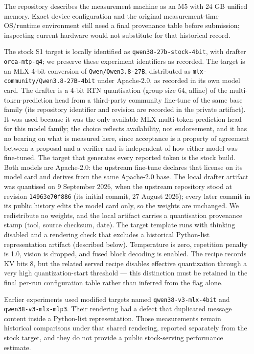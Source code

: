 \documentclass[
  11pt,
]{article}
\begin{document}
The repository describes the measurement machine as an M5 with 24 GB
unified memory. Exact device configuration and the original
measurement-time OS/runtime environment still need a final provenance
table before submission; inspecting current hardware would not
substitute for that historical record.

The stock S1 target is locally identified as
\texttt{qwen38-27b-stock-4bit}, with drafter \texttt{orca-mtp-q4}; we
preserve these experiment identifiers as recorded. The target is an MLX
4-bit conversion of \texttt{Qwen/Qwen3.8-27B}, distributed as
\texttt{mlx-community/Qwen3.8-27B-4bit} under Apache-2.0, as recorded in
its own model card. The drafter is a 4-bit RTN quantisation (group size
64, affine) of the multi-token-prediction head from
a third-party community fine-tune of the same base family (its
repository identifier and revision are recorded in the private artifact). It was used because
it was the only available MLX multi-token-prediction head for this model
family; the choice reflects availability, not endorsement, and it has no
bearing on what is measured here, since acceptance is a property of
agreement between a proposal and a verifier and is independent of how
either model was fine-tuned. The target that generates every reported
token is the stock build. Both models are Apache-2.0: the upstream
fine-tune declares that license on its model card and derives from the
same Apache-2.0 base. The local drafter artifact was quantised on 9
September 2026, when the upstream repository stood at revision
\texttt{14963e70f886} (its initial commit, 27 August 2026); every later
commit in its public history edits the model card only, so the weights
are unchanged. We redistribute no weights, and the local artifact
carries a quantisation provenance stamp (tool, source checksum, date).
The target template runs with thinking disabled and a rendering check
that excludes a historical Python-list representation artifact
(described below). Temperature is zero, repetition penalty is 1.0,
vision is dropped, and fused block decoding is enabled. The recipe
records KV bits 8, but the related served recipe disables effective
quantization through a very high quantization-start threshold --- this
distinction must be retained in the final per-run configuration table
rather than inferred from the flag alone.

Earlier experiments used modified targets named
\texttt{qwen38-v3-mlx-4bit} and \texttt{qwen38-v3-mlx-mlp3}. Their
rendering had a defect that duplicated message content inside a
Python-list representation. Those measurements remain historical
comparisons under that shared rendering, reported separately from the
stock target, and they do not provide a public stock-serving performance
estimate.
\end{document}
